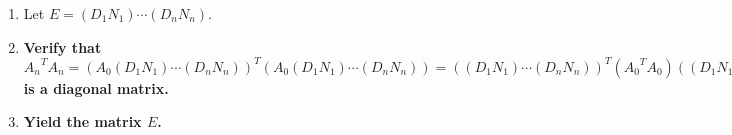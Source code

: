 \documentclass[twocolumn]{article}
\begin{document}
\begin{enumerate}
\begin{enumerate}
					\item Using \hyperref[sec:algorithm 8]{algorithm 8}, verify that $C_n(N_i)=1\ne 0$.
					\item Let $A_i=A_{i-1}D_iN_i$.
					\item \textbf{Verify that $C_n(A_i)=C_n(A_{i-1}D_iN_i)=C_n(A_{i-1})C_n(D_i)C_n(N_i)=C_n(A_{i-1})C_n(D_i)\ne 0$}.
					\item Verify that ${A_{i-1}}^TA_i=({A_{i-1}}^TA_{i-1})D_iN_i$ is a matrix with $0$s from position $(i,i+1)$ to $(i,n)$.
					\item \textbf{Verify that ${A_i}^TA_i=(A_{i-1}D_iN_i)^T(A_{i-1}D_iN_i)={N_i}^T{D_i}^T({A_{i-1}}^TA_{i-1})D_iN_i$ is a matrix with $0$s from position $(i,i+1)$ to $(i,n)$ and from position $(i+1,i)$ to $(n,i)$.}
					\item Verify that $A_i=A_0(D_1N_1)\cdots (D_iN_i)$.
					\item Verify that $MA_i=(D_1N_1)\cdots (D_iN_i)$.
					\item For $j=1$ to $j=n$, do the following:
					\begin{enumerate}
						\item Using \hyperref[sec:algorithm 49]{algorithm 49}, verify that $({e_j}^TM)(A_ie_j)={e_j}^T(MA_i)e_j={e_j}^T((D_1N_1)\cdots (D_iN_i))e_j=({D_1}_{j,j}{N_1}_{j,j})\cdots ({D_i}_{j,j}{N_i}_{j,j})$.
						\item \textbf{Therefore using (5d) verify that $({e_j}^TM)(A_ie_j)={D_1}_{j,j}\cdots {D_i}_{j,j}={D_1}_{j,j}\cdots {D_{\min(i,j-1)}}_{j,j}=\lVert A_0e_1\rVert^2\cdots\lVert A_{\min(i,j-1)-1}e_{\min(i,j-1)}\rVert^2$.}
					\end{enumerate}
				\end{enumerate}
				\item Let $E=(D_1N_1)\cdots (D_nN_n)$.
				\item \textbf{Verify that ${A_n}^TA_n=(A_0(D_1N_1)\cdots (D_nN_n))^T(A_0(D_1N_1)\cdots (D_nN_n))=((D_1N_1)\cdots (D_nN_n))^T({A_0}^TA_0)((D_1N_1)\cdots (D_nN_n))=E^T({A_0}^TA_0)E$ is a diagonal matrix.}
				\item \textbf{Yield the matrix $E$.}
			\end{enumerate}
\end{document}
